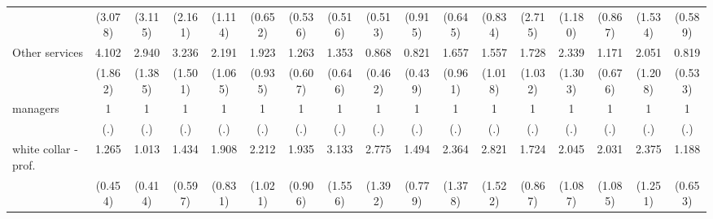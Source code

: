 {\begin{tabular}{l*{16}{c}}
                    &     (3.078)         &     (3.115)         &     (2.161)         &     (1.114)         &     (0.652)         &     (0.536)         &     (0.516)         &     (0.513)         &     (0.915)         &     (0.645)         &     (0.834)         &     (2.715)         &     (1.180)         &     (0.867)         &     (1.534)         &     (0.589)         \\
[1em]
Other services      &       4.102\sym{**} &       2.940\sym{*}  &       3.236\sym{*}  &       2.191         &       1.923         &       1.263         &       1.353         &       0.868         &       0.821         &       1.657         &       1.557         &       1.728         &       2.339         &       1.171         &       2.051         &       0.819         \\
                    &     (1.862)         &     (1.385)         &     (1.501)         &     (1.065)         &     (0.935)         &     (0.607)         &     (0.646)         &     (0.462)         &     (0.439)         &     (0.961)         &     (1.018)         &     (1.032)         &     (1.303)         &     (0.676)         &     (1.208)         &     (0.533)         \\
[1em]
managers            &           1         &           1         &           1         &           1         &           1         &           1         &           1         &           1         &           1         &           1         &           1         &           1         &           1         &           1         &           1         &           1         \\
                    &         (.)         &         (.)         &         (.)         &         (.)         &         (.)         &         (.)         &         (.)         &         (.)         &         (.)         &         (.)         &         (.)         &         (.)         &         (.)         &         (.)         &         (.)         &         (.)         \\
[1em]
white collar - prof.&       1.265         &       1.013         &       1.434         &       1.908         &       2.212         &       1.935         &       3.133\sym{*}  &       2.775\sym{*}  &       1.494         &       2.364         &       2.821         &       1.724         &       2.045         &       2.031         &       2.375         &       1.188         \\
                    &     (0.454)         &     (0.414)         &     (0.597)         &     (0.831)         &     (1.021)         &     (0.906)         &     (1.556)         &     (1.392)         &     (0.779)         &     (1.378)         &     (1.522)         &     (0.867)         &     (1.087)         &     (1.085)         &     (1.251)         &     (0.653)         \\

\end{tabular}}
